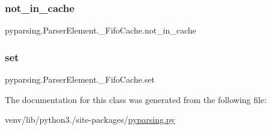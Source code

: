 \subsubsection{\texorpdfstring{not\+\_\+in\+\_\+cache}{not\_in\_cache}}
{\footnotesize\ttfamily pyparsing.\+Parser\+Element.\+\_\+\+Fifo\+Cache.\+not\+\_\+in\+\_\+cache}

\mbox{\label{classpyparsing_1_1ParserElement_1_1__FifoCache_af14e05835b096c368819202284105f3f}} 
\subsubsection{\texorpdfstring{set}{set}}
{\footnotesize\ttfamily pyparsing.\+Parser\+Element.\+\_\+\+Fifo\+Cache.\+set}



The documentation for this class was generated from the following file\+:\begin{DoxyCompactItemize}
\item 
venv/lib/python3./site-\/packages/\hyperlink{pyparsing_8py}{pyparsing.\+py}\end{DoxyCompactItemize}
